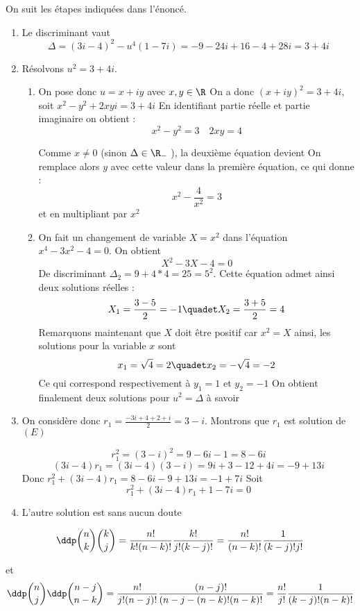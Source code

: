 \documentclass[a4paper, 11pt,reqno]{article}
\begin{document}
\begin{correction}
On suit les étapes indiquées dans l'énoncé. 
\begin{enumerate}
\item Le discriminant vaut 
$$\Delta = (3i-4)^2 -u^4 (1-7i) = -9-24i +16 -4+28i = 3+4i$$
\item Résolvons $u^2=3+4i$. \begin{enumerate}
\item On pose donc $u=x+iy$ avec $x,y\in \R$ 
On a  donc $(x+iy)^2 = 3+4i $, soit $x^2-y^2 +2xyi =3+4i$ En identifiant partie réelle et partie imaginaire on obtient : 
$$x^2 -y^2 =3 \quad 2xy=4$$

Comme $x\neq 0 $ (sinon $\Delta\in \R_-$ ), la deuxième équation devient 
 On remplace alors $y$ avec cette valeur dans la première équation, ce qui donne : 
$$x^2 -\frac{4}{x^2}=3$$ et  en multipliant par $x^2$ 

\item On fait un changement de variable $X=x^2$ dans l'équation $x^4-3x^2-4=0$. On obtient 
$$X^2 -3X-4=0$$
De discriminant $\Delta_2 = 9+4*4=25=5^2$. Cette équation admet ainsi deux solutions réelles : 
$$X_1= \frac{3-5}{2}= -1\quadet X_2 =\frac{3+5}{2}=4$$
Remarquons maintenant que $X$ doit être positif car $x^2=X$ ainsi, les solutions pour la variable $x$ sont 
$$x_1 =\sqrt{4}=2 \quadet x_2 =-\sqrt{4}=-2$$
Ce qui correspond respectivement à $y_1= 1$ et $y_2= -1$
On obtient finalement deux solutions pour $u^2=\Delta $ 
à savoir 



\end{enumerate}
\item  On considère donc $r_1 = \frac{-3i+4+2+i}{2}= 3-i$. Montrons que $r_1$ est solution de $(E)$ 

$$r_1^2 = (3-i)^2 = 9-6i-1=8-6i$$
$$(3i-4)r_1 =(3i-4) (3-i) = 9i+3-12+4i = -9+13i$$
Donc 
$r_1^2 +(3i-4)r_1 = 8-6i -9+13i  =-1 +7i$
Soit 
$$r_1^2 +(3i-4)r_1 +1-7i=0$$

\item L'autre solution est sans aucun doute 

\end{enumerate}
\end{correction}


\begin{correction}
 $$\ddp\binom{n}{k}\binom{k}{j} =\frac{n! }{k! (n-k)!} \frac{k! }{j! (k-j)!}=\frac{n! }{ (n-k)!} \frac{1 }{(k-j)!j!} $$
 
 et 
 $$\ddp\binom{n}{j}\ddp\binom{n-j}{n-k} = \frac{n! }{j! (n-j)!} \frac{(n-j)! }{(n-j-(n-k)! (n-k)!}= \frac{n! }{j!} \frac{1 }{(k-j)! (n-k)!}$$
\end{correction}
\end{document}
